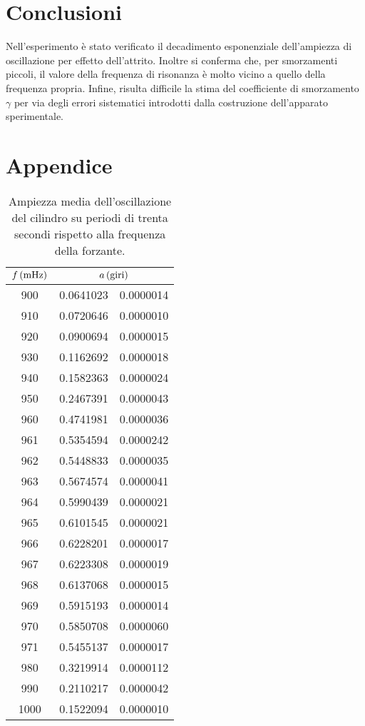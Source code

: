 \documentclass[italian,a4paper]{article}
\begin{document}
\section{Conclusioni}
Nell'esperimento è stato verificato il decadimento esponenziale dell'ampiezza di oscillazione per effetto dell'attrito. Inoltre si conferma che, per smorzamenti piccoli, il valore della frequenza di risonanza è molto vicino a quello della frequenza propria. Infine, risulta difficile la stima del coefficiente di smorzamento $\gamma$ per via degli errori sistematici introdotti dalla costruzione dell'apparato sperimentale.
\newpage
\section{Appendice}
\begin{table}[hp]\caption{Ampiezza media dell'oscillazione del cilindro su periodi di trenta secondi rispetto alla frequenza della forzante.}\label{ampiezze}
\centering
 \begin{tabular}{c r@{$\pm$}l}
$\unit[f]{(mHz)}$ & \multicolumn{2}{c}{$\unit[a]{(giri)}$}\\\hline
900 & 0.0641023 & 0.0000014 \\
910 & 0.0720646 & 0.0000010 \\
920 & 0.0900694 & 0.0000015 \\
930 & 0.1162692 & 0.0000018 \\
940 & 0.1582363 & 0.0000024 \\
950 & 0.2467391 & 0.0000043 \\
960 & 0.4741981 & 0.0000036 \\
961 & 0.5354594 & 0.0000242 \\
962 & 0.5448833 & 0.0000035 \\
963 & 0.5674574 & 0.0000041 \\
964 & 0.5990439 & 0.0000021 \\
965 & 0.6101545 & 0.0000021 \\
966 & 0.6228201 & 0.0000017 \\
967 & 0.6223308 & 0.0000019 \\
968 & 0.6137068 & 0.0000015 \\
969 & 0.5915193 & 0.0000014 \\
970 & 0.5850708 & 0.0000060 \\
971 & 0.5455137 & 0.0000017 \\
980 & 0.3219914 & 0.0000112 \\
990 & 0.2110217 & 0.0000042 \\
1000 & 0.1522094 & 0.0000010 \\
\end{tabular}
\end{table}
\end{document}
